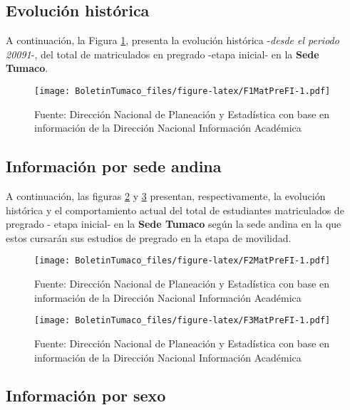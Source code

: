 \documentclass[
]{book}
\begin{document}
\hypertarget{evoluciuxf3n-histuxf3rica-3}{%
\subsection{Evolución histórica}\label{evoluciuxf3n-histuxf3rica-3}}

A continuación, la Figura \ref{fig:F1MatPreFI}, presenta la evolución histórica -\emph{desde el periodo 20091}-, del total de matriculados en pregrado -etapa inicial- en la \textbf{Sede Tumaco}.

\begin{figure}
\centering
\texttt{[image: BoletinTumaco\_files/figure-latex/F1MatPreFI-1.pdf]}
\caption{\label{fig:F1MatPreFI}Fuente: Dirección Nacional de Planeación y Estadística con base en información de la Dirección Nacional Información Académica}
\end{figure}

\hypertarget{informaciuxf3n-por-sede-andina-1}{%
\subsection{Información por sede andina}\label{informaciuxf3n-por-sede-andina-1}}

A continuación, las figuras \ref{fig:F2MatPreFI} y \ref{fig:F3MatPreFI} presentan, respectivamente, la evolución histórica y el comportamiento actual del total de estudiantes matriculados de pregrado - etapa inicial- en la \textbf{Sede Tumaco} según la sede andina en la que estos cursarán sus estudios de pregrado en la etapa de movilidad.

\begin{figure}
\centering
\texttt{[image: BoletinTumaco\_files/figure-latex/F2MatPreFI-1.pdf]}
\caption{\label{fig:F2MatPreFI}Fuente: Dirección Nacional de Planeación y Estadística con base en información de la Dirección Nacional Información Académica}
\end{figure}

\begin{figure}
\centering
\texttt{[image: BoletinTumaco\_files/figure-latex/F3MatPreFI-1.pdf]}
\caption{\label{fig:F3MatPreFI}Fuente: Dirección Nacional de Planeación y Estadística con base en información de la Dirección Nacional Información Académica}
\end{figure}

\hypertarget{informaciuxf3n-por-sexo-3}{%
\subsection{Información por sexo}\label{informaciuxf3n-por-sexo-3}}
\end{document}
